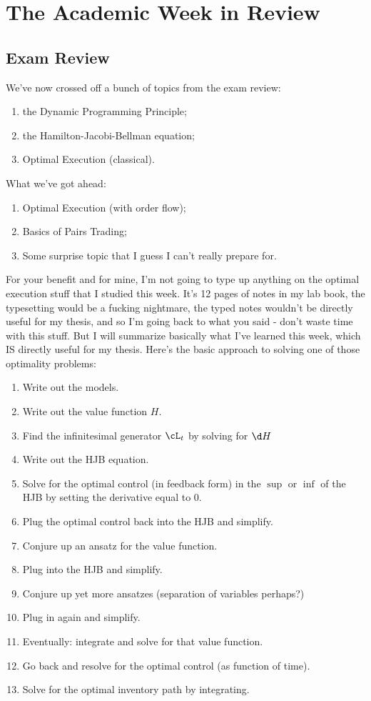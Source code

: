\documentclass[12pt]{article}
\begin{document}
\section*{The Academic Week in Review}
\subsection*{Exam Review}
We've now crossed off a bunch of topics from the exam review:
\begin{enumerate}[noitemsep, topsep=0pt]
\item the Dynamic Programming Principle;
\item the Hamilton-Jacobi-Bellman equation;
\item Optimal Execution (classical).
\end{enumerate}
What we've got ahead:
\begin{enumerate}[noitemsep, topsep=0pt]
\item Optimal Execution (with order flow);
\item Basics of Pairs Trading;
\item Some surprise topic that I guess I can't really prepare for.
\end{enumerate}

For your benefit and for mine, I'm not going to type up anything on the optimal execution stuff that I studied this week. It's 12 pages of notes in my lab book, the typesetting would be a fucking nightmare, the typed notes wouldn't be directly useful for my thesis, and so I'm going back to what you said - don't waste time with this stuff. But I will summarize basically what I've learned this week, which IS directly useful for my thesis. Here's the basic approach to solving one of those optimality problems:

\begin{enumerate}[noitemsep, topsep=0pt]
\item Write out the models.
\item Write out the value function $H$.
\item Find the infinitesimal generator $\cL_t$ by solving for $\d H$
\item Write out the HJB equation.
\item Solve for the optimal control (in feedback form) in the $\sup$ or $\inf$ of the HJB by setting the derivative equal to 0.
\item Plug the optimal control back into the HJB and simplify.
\item Conjure up an ansatz for the value function.
\item Plug into the HJB and simplify. 
\item Conjure up yet more ansatzes (separation of variables perhaps?)
\item Plug in again and simplify.
\item Eventually: integrate and solve for that value function. 
\item Go back and resolve for the optimal control (as function of time).
\item Solve for the optimal inventory path by integrating. 
\end{enumerate}
\end{document}
